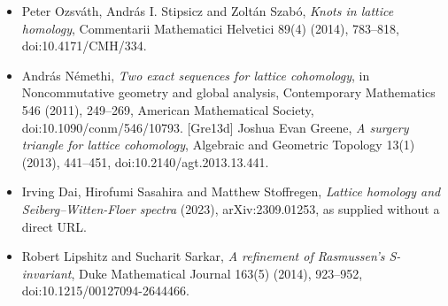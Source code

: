 \documentclass[11pt]{article}
\begin{document}
\begin{itemize}
\item [OSS14a] Peter Ozsváth, András I. Stipsicz and Zoltán Szabó, \emph{Knots in lattice homology}, Commentarii Mathematici Helvetici 89(4) (2014), 783--818, doi:10.4171/CMH/334.
\item [Ném11] András Némethi, \emph{Two exact sequences for lattice cohomology}, in Noncommutative geometry and global analysis, Contemporary Mathematics 546 (2011), 249--269, American Mathematical Society, doi:10.1090/conm/546/10793. [Gre13d] Joshua Evan Greene, \emph{A surgery triangle for lattice cohomology}, Algebraic and Geometric Topology 13(1) (2013), 441--451, doi:10.2140/agt.2013.13.441.
\item [DSS23] Irving Dai, Hirofumi Sasahira and Matthew Stoffregen, \emph{Lattice homology and Seiberg--Witten-Floer spectra} (2023), arXiv:2309.01253, as supplied without a direct URL.
\item [LS14] Robert Lipshitz and Sucharit Sarkar, \emph{A refinement of Rasmussen's S-invariant}, Duke Mathematical Journal 163(5) (2014), 923--952, doi:10.1215/00127094-2644466.
\end{itemize}
\end{document}
